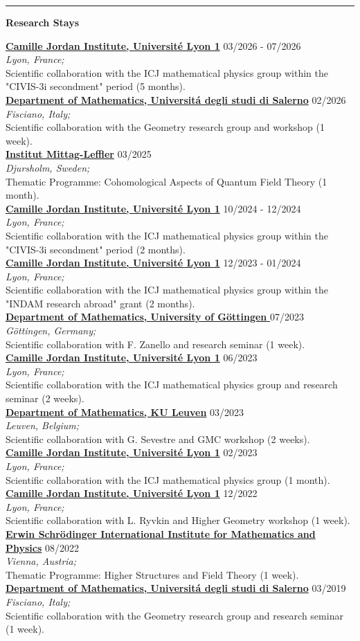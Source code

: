 \documentclass[a4paper]{article}
\newcommand{\block}[1]{\hrule \vspace{0.2cm} \textbf{\Large #1} \vspace{0.2cm}}
\newcommand{\voice}[5]{\href{#4}{\textbf{#1}} \hfill #2 \\ \textit{#3} \\ {\small #5} \vspace{0.2cm} \\}
\begin{document}
\vspace{1em}


	\block{Research Stays}

    \voice{Camille Jordan Institute, Université Lyon 1}
        {03/2026 - 07/2026}
        {Lyon, France;}
        {https://physmath.pages.math.cnrs.fr/}       
        {Scientific collaboration with the ICJ mathematical physics group within the "CIVIS-3i secondment" period (5 months).}
    \voice{Department of Mathematics, Universit\'a degli studi di Salerno}
        {02/2026}
        {Fisciano, Italy;}
        {http://geometria.dipmat.unisa.it/events.html}       
        {Scientific collaboration with the Geometry research group and workshop (1 week).}
    \voice{Institut Mittag-Leffler}
        {03/2025}
        {Djursholm, Sweden;}
        {https://www.mittag-leffler.se/activities/cohomological-aspects-of-quantum-field-theory/}       
        {Thematic Programme: Cohomological Aspects of Quantum Field Theory (1 month).}
    \voice{Camille Jordan Institute, Université Lyon 1}
        {10/2024 - 12/2024}
        {Lyon, France;}
        {https://physmath.pages.math.cnrs.fr/}       
        {Scientific collaboration with the ICJ mathematical physics group within the "CIVIS-3i secondment" period (2 months).}
	\voice{Camille Jordan Institute, Université Lyon 1}
		{12/2023 - 01/2024}
		{Lyon, France;}
		{None}       
		{Scientific collaboration with the ICJ mathematical physics group within the "INDAM research abroad" grant (2 months).}
	\voice{Department of Mathematics, University of Göttingen }
		{07/2023}
		{Göttingen, Germany;}
		{None}       
		{Scientific collaboration with F. Zanello and research seminar (1 week).}
	\voice{Camille Jordan Institute, Université Lyon 1}
		{06/2023}
		{Lyon, France;}
		{None}       
		{Scientific collaboration with the ICJ mathematical physics group and research seminar (2 weeks).}
	\voice{Department of Mathematics, KU Leuven}
		{03/2023}
		{Leuven, Belgium;}
		{None}       
		{Scientific collaboration with G. Sevestre and GMC workshop (2 weeks).}
	\voice{Camille Jordan Institute, Université Lyon 1}
		{02/2023}
		{Lyon, France;}
		{None}       
		{Scientific collaboration with the ICJ mathematical physics group (1 month).}
	\voice{Camille Jordan Institute, Université Lyon 1}
		{12/2022}
		{Lyon, France;}
		{None}       
		{Scientific collaboration with L. Ryvkin and Higher Geometry workshop (1 week).}
	\voice{Erwin Schrödinger International Institute for Mathematics and Physics}
		{08/2022}
		{Vienna, Austria;}
		{https://www.esi.ac.at/events/e430/}       
		{Thematic Programme: Higher Structures and Field Theory (1 week).}
	\voice{Department of Mathematics, Universit\'a degli studi di Salerno}
		{03/2019}
		{Fisciano, Italy;}
		{http://geometria.dipmat.unisa.it/events.html}       
		{Scientific collaboration with the Geometry research group and research seminar (1 week).}
\end{document}
